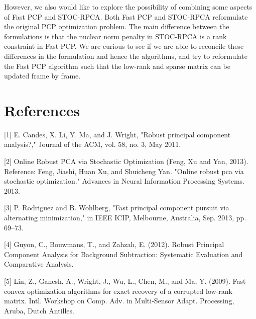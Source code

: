 \documentclass[oneside]{article}
\begin{document}
\newline\newline
However, we also would like to explore the possibility of combining some aspects of Fast PCP and STOC-RPCA. Both Fast PCP and STOC-RPCA reformulate the original PCP optimization problem. The main difference between the formulations is that the nuclear norm penalty in STOC-RPCA is a rank constraint in Fast PCP. We are curious to see if we are able to reconcile these differences in the formulation and hence the algorithms, and try to reformulate the Fast PCP algorithm such that the low-rank and sparse matrix can be updated frame by frame.

\section{References}
[1] \hspace*{8pt} E. Candes, X. Li, Y. Ma, and J. Wright, "Robust principal component analysis?," Journal of the ACM, vol. 58,
no. 3, May 2011.

[2] \hspace*{8pt}Online Robust PCA via Stochastic Optimization	(Feng, Xu and Yan, 2013). Reference: Feng, Jiashi, Huan Xu, and Shuicheng Yan. "Online robust pca via stochastic optimization." Advances in Neural Information Processing Systems. 2013.

[3] \hspace*{8pt}P. Rodriguez and B. Wohlberg, "Fast principal component pursuit via alternating minimization," in IEEE ICIP, Melbourne, Australia, Sep. 2013, pp. 69–73.

[4] \hspace*{8pt}Guyon, C., Bouwmans, T., and Zahzah, E. (2012). Robust Principal Component Analysis for Background Subtraction: Systematic Evaluation and Comparative Analysis.

[5] \hspace*{8pt}Lin, Z., Ganesh, A., Wright, J., Wu, L., Chen, M., and Ma, Y. (2009). Fast convex optimization algorithms for exact recovery of a corrupted low-rank matrix. Intl. Workshop on Comp. Adv. in Multi-Sensor Adapt. Processing, Aruba, Dutch Antilles.
\end{document}
